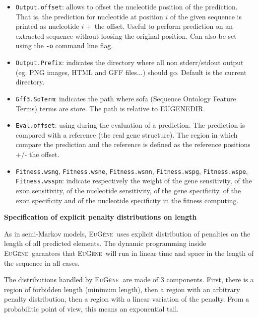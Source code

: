 \documentclass[a4paper,titlepage]{report}
\newcommand{\EuGene}{\textsc{EuG\`ene}}
\begin{document}
\begin{itemize}
\item \texttt{Output.offset}: allows to offset the nucleotide position
  of the prediction.  That is, the prediction for nucleotide at
  position $i$ of the given sequence is printed as nucleotide $i+$ the
  offset. Useful to perform prediction on an extracted sequence
  without loosing the original position. Can also be set using the
  \texttt{-o} command line flag. 
  
\item \texttt{Output.Prefix}: indicates the directory where all non
  stderr/stdout output (eg. PNG images, HTML and GFF files...) should go.
  Default is the current directory.

\item \texttt{Gff3.SoTerm}: indicates the path where sofa (Sequence Ontology Feature Terms) terms are store.
  The path is relative to EUGENEDIR.

\item \texttt{Eval.offset}: using during the evaluation of a prediction. 
The prediction is compared with a reference (the real gene structure). 
The region in which compare the prediction and the reference is defined 
	as the reference positions +/- the offset.

\item \texttt{Fitness.wsng}, \texttt{Fitness.wsne}, 
\texttt{Fitness.wsnn}, \texttt{Fitness.wspg}, 
\texttt{Fitness.wspe}, \texttt{Fitness.wsspn}: 
indicate respectively the weight of the gene sensitivity, of the exon sensitivity, 
of the nucleotide sensitivity, of the gene specificity, of the exon specificity 
and of the nucleotide specificity in the fitness computing.
\end{itemize}

{\bf Specification of explicit penalty distributions on length}

As in semi-Markov models, \EuGene\ uses explicit distribution of
penalties on the length of all predicted elements. The dynamic
programming inside \EuGene\ garantees that \EuGene\ will run in linear
time and space in the length of the sequence in all cases.

The distributions handled by \EuGene\ are made of 3 components. First,
there is a region of forbidden length (minimum length), then a region
with an arbitrary penalty distribution, then a region with a linear
variation of the penalty. From a probabilitic point of view, this means
an exponential tail.
\end{document}
